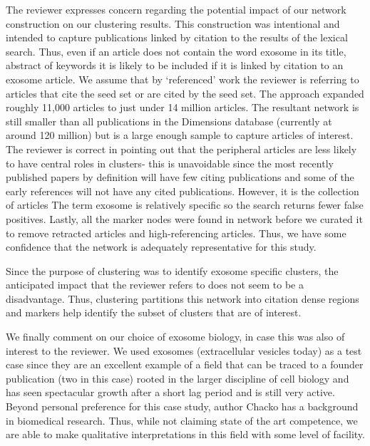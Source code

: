 \documentclass[11pt, oneside]{article}   	%
\begin{document}
The reviewer expresses concern regarding the potential impact of our network construction on our clustering results.  This construction was intentional and intended to capture publications linked by citation to the results of the lexical search. Thus, even if an article does not contain the word exosome in its title, abstract of keywords it is likely to be included if it is linked by citation to an exosome article. We assume that by `referenced' work the reviewer is referring to articles that cite the seed set or are cited by the seed set. The approach expanded roughly 11,000 articles to just under 14 million articles. The resultant network is still smaller than all publications in the Dimensions database (currently at around 120 million) but is a large enough sample to capture articles of interest. The reviewer is correct in pointing out that the peripheral articles are less likely to have central roles in clusters- this is unavoidable since the most recently published papers by definition will have few citing publications and some of the early references will not have any cited publications. However, it is the collection of articles The term exosome is relatively specific so the search returns fewer false positives. Lastly, all the marker nodes were found in network before we curated it to remove retracted articles and high-referencing articles. Thus, we have some confidence that the network is adequately representative for this study.  

Since the purpose of clustering was to identify exosome specific clusters, the anticipated impact that the reviewer refers to does not seem to be a disadvantage. Thus, clustering partitions this network into citation dense regions and markers help identify the subset of clusters that are of interest. 

We finally comment on our choice of exosome biology, in case this was also of interest to the reviewer. We used exosomes (extracellular vesicles today) as a test case since they are an excellent example of a field that can be traced to a founder publication (two in this case) rooted in the larger discipline of cell biology and has seen spectacular growth after a short lag period and is still very active. Beyond personal preference for this case study, author Chacko has a background in biomedical research. Thus, while not claiming state of the art competence, we are able to make qualitative interpretations in this field with some level of facility.  
\end{document}
